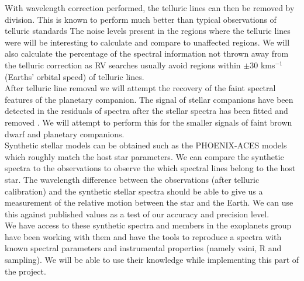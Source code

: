 \documentclass[pdftex,12pt,a4paper]{article}
\begin{document}
With wavelength correction performed, the telluric lines can then be removed by division. This is known to perform much better than typical observations of telluric standards \citep[see][for details]{Figueria2015prep} The noise levels present in the regions where the telluric lines were will be interesting to calculate and compare to unaffected regions. We will also calculate the percentage of the spectral information not thrown away from the telluric correction as {RV} searches usually avoid regions within $\pm$30 kms$^{-1}$ (Earths' orbital speed) of telluric lines.\\



After telluric line removal we will attempt the recovery of the faint spectral features of the planetary companion. The signal of stellar companions have been detected in the residuals of spectra after the stellar spectra has been fitted and removed \citep[e.g.][]{kolbl2015}. We will attempt to perform this for the smaller signals of faint brown dwarf and planetary companions. \\

Synthetic stellar models can be obtained such as the PHOENIX-ACES models \citep{Husser2013-PHOENIX-ACES} which roughly match the host star parameters. We can compare the synthetic spectra to the observations to observe the which spectral lines belong to the host star. The wavelength difference between the observations (after telluric calibration) and the synthetic stellar spectra should be able to give us a measurement of the relative motion between the star and the Earth. We can use this against published values as a test of our accuracy and precision level.\\

We have access to these synthetic spectra and members in the exoplanets group have been working with them and have the tools to reproduce a spectra with known spectral parameters and instrumental properties (namely vsini, R and sampling). We will be able to use their knowledge while implementing this part of the project. \\
\end{document}

